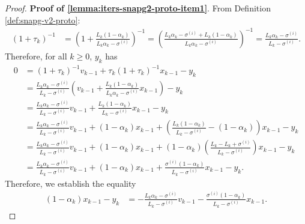 \documentclass[12pt]{article}
\begin{document}
    \begin{proof}
        \textbf{Proof of \ref{lemma:iters-snapg2-proto-item1}}. 
        From Definition \ref{def:snapg-v2-proto}:
        \begin{align*}
            (1 + \tau_k)^{-1}
            &=
            \left(
                1 + \frac{L_k(1 - \alpha_k)}{L_k\alpha_k - \sigma^{(i)}}
            \right)^{-1} = \left(
                \frac{L_k\alpha_k - \sigma^{(i)} + L_k(1 - \alpha_k)}{L_k\alpha_k - \sigma^{(i)}}
            \right)^{-1}
            = \frac{L_k\alpha_k - \sigma^{(i)}}{L_k - \sigma^{(i)}}. 
        \end{align*}
        Therefore, for all $k \ge 0$, $y_k$ has 
        \begin{align*}
            0 &= (1 + \tau_k)^{-1} v_{k - 1} + \tau_k (1 + \tau_k)^{-1} x_{k - 1} - y_k
            \\
            &= \frac{L_k\alpha_k - \sigma^{(i)}}{L_k - \sigma^{(i)}} 
            \left(
                v_{k - 1} + \frac{L_k(1 - \alpha_k)}{L_k\alpha_k - \sigma^{(i)}} x_{k - 1}
            \right) - y_k
            \\
            &= \frac{L_k\alpha_k - \sigma^{(i)}}{L_k - \sigma^{(i)}} v_{k - 1}
            + \frac{L_k(1 - \alpha_k)}{L_k - \sigma^{(i)}} x_{k - 1} - y_k
            \\
            &= \frac{L_k\alpha_k - \sigma^{(i)}}{L_k - \sigma^{(i)}} v_{k - 1} + (1 - \alpha_k)x_{k - 1}
            + 
            \left(
                \frac{L_k(1 - \alpha_k)}{L_k - \sigma^{(i)}} - (1 - \alpha_k)
            \right) x_{k - 1} - y_k
            \\
            &= \frac{L_k\alpha_k - \sigma^{(i)}}{L_k - \sigma^{(i)}} v_{k - 1} + (1 - \alpha_k)x_{k - 1}
            + 
            (1 - \alpha_k)\left(
                \frac{L_k - L_k + \sigma^{(i)}}{L_k - \sigma^{(i)}}
            \right) x_{k - 1} - y_k
            \\
            &= \frac{L_k\alpha_k - \sigma^{(i)}}{L_k - \sigma^{(i)}} v_{k - 1} + (1 - \alpha_k)x_{k - 1}
            + 
            \frac{\sigma^{(i)}(1 - \alpha_k)}{L_k - \sigma^{(i)}}x_{k - 1} - y_k. 
        \end{align*}
        Therefore, we establish the equality 
        \begin{align*}
            (1 - \alpha_k)x_{k - 1} - y_k &= 
            - \frac{L_k\alpha_k - \sigma^{(i)}}{L_k - \sigma^{(i)}} v_{k - 1} 
            - \frac{\sigma^{(i)}(1 - \alpha_k)}{L_k - \sigma^{(i)}} x_{k - 1}. 
        \end{align*}

\end{proof}
\end{document}
